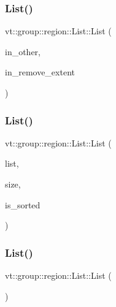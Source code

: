 \subsubsection{\texorpdfstring{List()}{List()}\hspace{0.1cm}{\footnotesize\ttfamily [3/6]}}
{\footnotesize\ttfamily vt\+::group\+::region\+::\+List\+::\+List (\begin{DoxyParamCaption}\item[{\hyperlink{structvt_1_1group_1_1region_1_1_list}{List} const \&}]{in\+\_\+other,  }\item[{\hyperlink{structvt_1_1group_1_1region_1_1_region_abf426ff85bed72c1c6524fad6a9f1751}{Bound\+Type}}]{in\+\_\+remove\+\_\+extent }\end{DoxyParamCaption})}

\mbox{\label{structvt_1_1group_1_1region_1_1_list_ac23de857aeb512b1129fe62dd50dfe9f}} 
\subsubsection{\texorpdfstring{List()}{List()}\hspace{0.1cm}{\footnotesize\ttfamily [4/6]}}
{\footnotesize\ttfamily vt\+::group\+::region\+::\+List\+::\+List (\begin{DoxyParamCaption}\item[{\hyperlink{structvt_1_1group_1_1region_1_1_region_abf426ff85bed72c1c6524fad6a9f1751}{Bound\+Type} const $\ast$const}]{list,  }\item[{\hyperlink{structvt_1_1group_1_1region_1_1_region_a9bb381adf31111aae34dbc644bad6c1f}{Size\+Type} const \&}]{size,  }\item[{bool const \&}]{is\+\_\+sorted }\end{DoxyParamCaption})}

\mbox{\label{structvt_1_1group_1_1region_1_1_list_a4f5cfc858b58c690a24f10621351e904}} 
\subsubsection{\texorpdfstring{List()}{List()}\hspace{0.1cm}{\footnotesize\ttfamily [5/6]}}
{\footnotesize\ttfamily vt\+::group\+::region\+::\+List\+::\+List (\begin{DoxyParamCaption}\item[{\hyperlink{structvt_1_1group_1_1region_1_1_list}{List} const \&}]{ }\end{DoxyParamCaption})\hspace{0.3cm}{\ttfamily [default]}}

